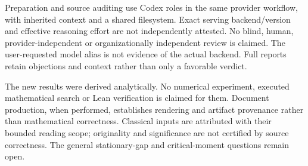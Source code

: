 \documentclass[11pt]{article}
\begin{document}
Preparation and source auditing use Codex roles in the same provider workflow, with inherited context and a shared filesystem. Exact serving backend/version and effective reasoning effort are not independently attested. No blind, human, provider-independent or organizationally independent review is claimed. The user-requested model alias is not evidence of the actual backend. Full reports retain objections and context rather than only a favorable verdict.

The new results were derived analytically. No numerical experiment, executed mathematical search or Lean verification is claimed for them. Document production, when performed, establishes rendering and artifact provenance rather than mathematical correctness. Classical inputs are attributed with their bounded reading scope; originality and significance are not certified by source correctness. The general stationary-gap and critical-moment questions remain open.
\end{document}
